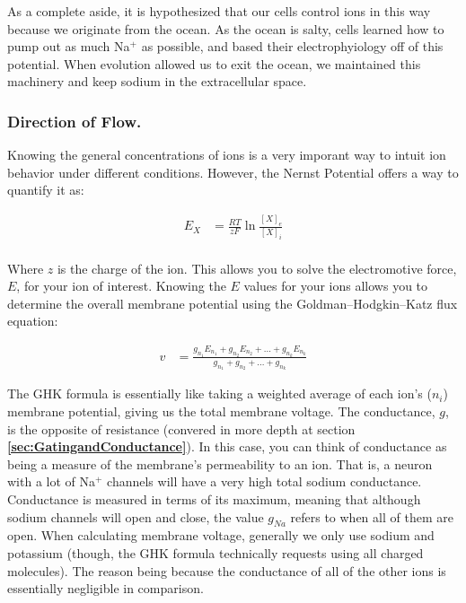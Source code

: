 \documentclass[12pt]{report}
\begin{document}
As a complete aside, it is hypothesized that our cells control ions in this way because we originate from the ocean. As the ocean is salty, cells learned how to pump out as much Na$^+$ as possible, and based their electrophyiology off of this potential. When evolution allowed us to exit the ocean, we maintained this machinery and keep sodium in the extracellular space. 

\subsubsection{Direction of Flow.}

Knowing the general concentrations of ions is a very imporant way to intuit ion behavior under different conditions. However, the Nernst Potential offers a way to quantify it as: 

\begin{equation} \label{Nernst1}
\begin{split}
E_X &= \frac{RT}{zF}\ln\frac{[X]_e}{[X]_i}\\
\end{split}
\end{equation}

Where $z$ is the charge of the ion. This allows you to solve the electromotive force, $E$, for your ion of interest. Knowing the $E$ values for your ions allows you to determine the overall membrane potential using the Goldman–Hodgkin–Katz flux equation:

\begin{equation} \label{GHK}
\begin{split}
v &= \frac{g_{n_1}E_{n_1} + g_{n_2}E_{n_2} + ... + g_{n_k}E_{n_k}}{g_{n_1} + g_{n_2} + ... + g_{n_k}}
\end{split}
\end{equation}

The GHK formula is essentially like taking a weighted average of each ion's ($n_i$) membrane potential, giving us the total membrane voltage. The conductance, $g$, is the opposite of resistance (convered in more depth at section \textbf{\ref{sec:GatingandConductance}}). In this case, you can think of conductance as being a measure of the membrane's permeability to an ion. That is, a neuron with a lot of Na$^+$ channels will have a very high total sodium conductance. Conductance is measured in terms of its maximum, meaning that although sodium channels will open and close, the value $g_{Na}$ refers to when all of them are open. When calculating membrane voltage, generally we only use sodium and potassium (though, the GHK formula technically requests using all charged molecules). The reason being because the conductance of all of the other ions is essentially negligible in comparison.\newline
\end{document}
